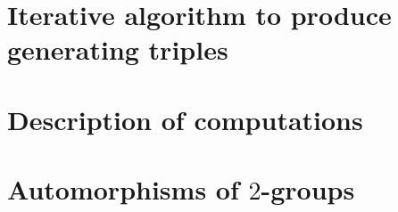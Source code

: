 \documentclass{dcthesis}
\newcommand{\mm}[1]{{\color{blue} \sf MM: [#1]}}
\newtheorem{lemma}[prop]{Lemma}
\theoremstyle{definition}
\newtheorem{definition}[prop]{Definition}
\theoremstyle{remark}
\numberwithin{equation}{section}
\numberwithin{figure}{section}
\begin{document}
{  \section{Iterative algorithm to produce generating triples}{\label{sec:triplesalgorithm}
  }
  \section{Description of computations}{\label{sec:grouptheorycomputations}
  }
  \section{Automorphisms of $2$-groups}{\label{sec:automorphismsoftwogroups}
  }
}
\end{document}
